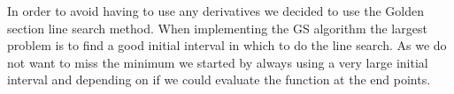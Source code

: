 In order to avoid having to use any derivatives we decided to use the Golden section line search method. When implementing the GS algorithm the largest problem is to find a good initial interval in which to do the line search. As we do not want to miss the minimum we started by always using a very large initial interval and depending on if we could evaluate the function at the end points.